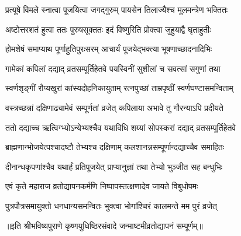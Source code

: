 \twolineshloka
{प्रत्यूषे विमले स्नात्वा पूजयित्वा जगद्गुरुम्}
{पायसेन तिलाज्यैश्च मूलमन्त्रेण भक्तितः}

\twolineshloka
{अष्टोत्तरशतं हुत्वा ततः पुरुषसूक्ततः}
{इदं विष्णुरिति प्रोक्त्वा जुहुयाद्वै घृताहुतीः}

\twolineshloka
{होमशेषं समाप्याथ पूर्णाहुतिपुरःसरम्}
{आचार्यं पूजयेद्भक्त्या भूषणाच्छादनादिभिः}

\twolineshloka
{गामेकां कपिलां दद्याद् व्रतसम्पूर्तिहेतवे}
{पयस्विनीं सुशीलां च सवत्सां सगुणां तथा}

\twolineshloka
{स्वर्णशृङ्गीं रौप्यखुरां कांस्यदोहनिकायुताम्}
{रत्नपुच्छां ताम्रपृष्ठीं स्वर्णघण्टासमन्विताम्}

\twolineshloka
{वस्त्रच्छन्नां दक्षिणाढ्यामेवं सम्पूर्णतां व्रजेत्}
{कपिलाया अभावे तु गौरन्याऽपि प्रदीयते}

\twolineshloka
{ततो दद्याच्च ऋत्विग्भ्योऽन्येभ्यश्चैव यथाविधि}
{शय्यां सोपस्करां दद्याद् व्रतसम्पूर्तिहेतवे}

\twolineshloka
{ब्राह्मणान्भोजयेत्पश्चादष्टौ तेभ्यश्च दक्षिणाम्}
{कलशानन्नसम्पूर्णान्दद्याच्चैव समाहितः}

\twolineshloka
{दीनान्धकृपणांश्चैव यथार्हं प्रतिपूजयेत्}
{प्राप्यानुज्ञां तथा तेभ्यो भुञ्जीत सह बन्धुभिः}

\twolineshloka
{एवं कृते महाराज व्रतोद्यापनकर्मणि}
{निष्पापस्तत्क्षणादेव जायते विबुधोपमः}

\twolineshloka
{पुत्रपौत्रसमायुक्तो धनधान्यसमन्वितः}
{भुक्त्वा भोगांश्चिरं कालमन्ते मम पुरं व्रजेत्}

॥इति श्रीभविष्यपुराणे कृष्णयुधिष्ठिरसंवादे जन्माष्टमीव्रतोद्यापनं सम्पूर्णम्॥

\endgroup